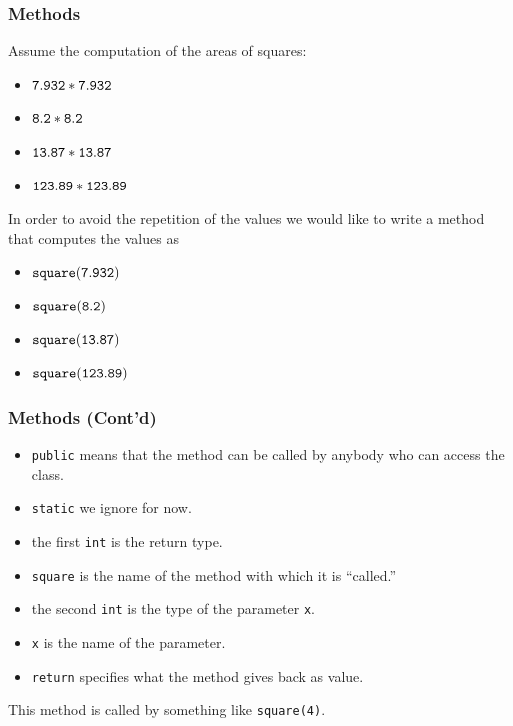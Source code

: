 \documentclass{beamer}
\begin{document}
\begin{frame}
\frametitle{Methods}
Assume the computation of the areas of squares:
\begin{itemize}
\item $\tt 7.932 * 7.932$
\item $\tt 8.2   * 8.2$
\item $\tt 13.87 * 13.87$
\item $\tt 123.89 * 123.89$
\end{itemize}

In order to avoid the repetition of the values we would like to write a method that computes the values as
\begin{itemize}
\item $\tt square(7.932)$
\item $\tt square(8.2)$
\item $\tt square(13.87)$
\item $\tt square(123.89)$
\end{itemize}
\end{frame}

\begin{frame}
\frametitle{Methods (Cont'd)}


\begin{itemize}
\item \texttt{public} means that the method can be called by anybody who can access the class. 
\item \texttt{static} we ignore for now.
\item the first \texttt{int} is the return type.
\item \texttt{square} is the name of the method with which it is ``called.''
\item the second \texttt{int} is the type of the parameter \texttt{x}.
\item \texttt{x} is the name of the parameter.
\item \texttt{return} specifies what the method gives back as value.
\end{itemize}

This method is called by something like \texttt{square(4)}.
\end{frame}
\end{document}

